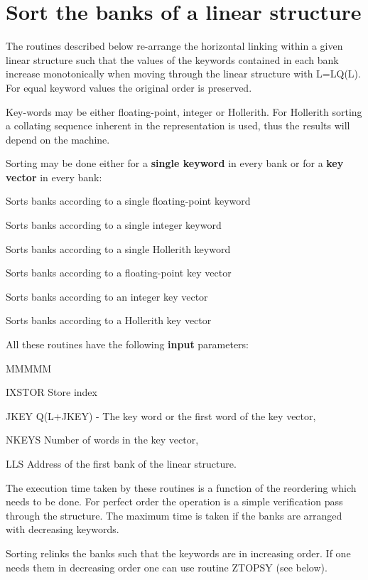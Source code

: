 \section{Sort the banks of a linear structure}
\par The routines described below
re-arrange the horizontal linking
within a given linear structure such that the values of the
keywords contained in
each bank increase monotonically when moving through the linear
structure with L=LQ(L).
For equal keyword values the original order is preserved.
\par Key-words may be either floating-point, integer or Hollerith.
For Hollerith sorting a collating sequence
inherent in the representation is used,
thus the results will depend on the machine.
\par Sorting may be done either for a
{\bf single keyword} in every bank
or for a {\bf key vector} in every bank:
\par Sorts banks according to a single floating-point keyword
\par Sorts banks according to a single integer keyword
\par Sorts banks according to a single Hollerith keyword
\par
{}
\par Sorts banks according to a floating-point key vector
\par Sorts banks according to an integer key vector
\par Sorts banks according to a Hollerith key vector
\par All these routines have the following {\bf input} parameters:
\begin{DL}{MMMMM}
\item[IXSTOR
]Store index
\item[JKEY
]Q(L+JKEY) - The key word or the first word of the key vector,
\item[NKEYS
]Number of words in the key vector,
\item[LLS
]Address of the first bank of the linear structure.
\end{DL}
\par The execution time taken by these routines is a function
of the reordering which needs to be done.
For perfect order the operation is a simple verification pass
through the structure.
The maximum time is taken if the banks are arranged with
decreasing keywords.
\par Sorting relinks the banks such that the keywords are in
increasing order.
If one needs them in decreasing order one can use routine ZTOPSY
(see below).
